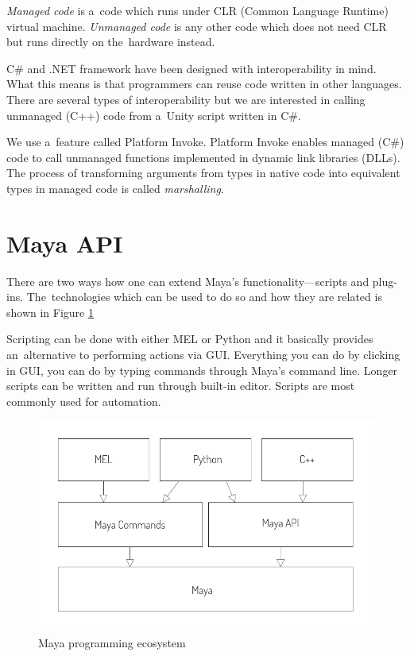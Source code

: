 \documentclass[
  digital, %
  table,   %
  nolof,     %
  nolot,     %
  oneside,
]{fithesis3}
\begin{document}
\textit{Managed code} is a code which runs under CLR (Common Language Runtime) virtual machine. \textit{Unmanaged code} is any other code which does not need CLR but runs directly on the hardware instead.

C\# and .NET framework have been designed with interoperability in mind. What this means is that programmers can reuse code written in other languages. There are several types of interoperability but we are interested in calling unmanaged (C++) code from a Unity script written in C\#.

We use a feature called Platform Invoke. Platform Invoke enables managed (C\#) code to call unmanaged functions implemented in dynamic link libraries (DLLs). The process of transforming arguments from types in native code into equivalent types in managed code is called \textit{marshalling}.

\section{Maya API}

There are two ways how one can extend Maya's functionality—scripts and plug-ins. The technologies which can be used to do so and how they are related is shown in Figure \ref{fig:maya-ecosystem}

Scripting can be done with either MEL or Python and it basically provides an alternative to performing actions via GUI. Everything you can do by clicking in GUI, you can do by typing commands through Maya's command line. Longer scripts can be written and run through built-in editor. Scripts are most commonly used for automation.

\begin{figure}
  \centering
  \includegraphics[scale=0.8]{images/maya-ecosystem.pdf}
  \caption{Maya programming ecosystem}
  \label{fig:maya-ecosystem}
\end{figure}
\end{document}
